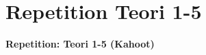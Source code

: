 \section{Repetition Teori 1-5}

\begin{frame}
  \vspace{3em}
  \begin{center}
    {\LARGE \textbf{Repetition: Teori 1-5 (Kahoot)}}
  \end{center}
\end{frame}